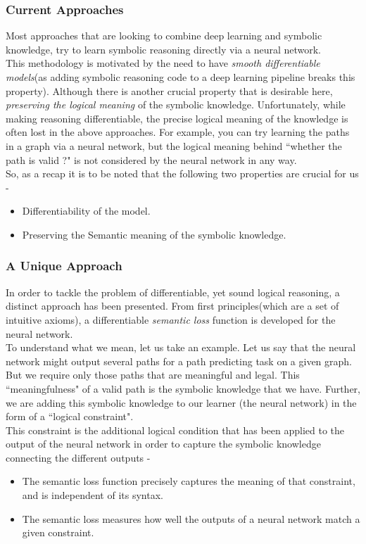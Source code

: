 \documentclass[12pt]{article}
\begin{document}
\subsubsection{Current Approaches}
Most approaches that are looking to combine deep learning and symbolic knowledge, try to learn symbolic reasoning directly via a neural network.\\
This methodology is motivated by the need to have \textit{smooth differentiable models}(as adding symbolic reasoning code to a deep learning pipeline breaks this property). Although there is another crucial property that is desirable here, \textit{preserving the logical meaning} of the symbolic knowledge. Unfortunately, while making reasoning differentiable, the precise logical meaning of the knowledge is often lost in the above approaches. For example, you can try learning the paths in a graph via a neural network, but the logical meaning behind ``whether the path is valid ?" is not considered by the neural network in any way.\\
So, as a recap it is to be noted that the following two properties are crucial for us - 
\begin{itemize}
    \item Differentiability of the model.
    \item Preserving the Semantic meaning of the symbolic knowledge.
\end{itemize}

\subsubsection{A Unique Approach}
In order to tackle the problem of differentiable, yet sound logical reasoning, a distinct approach has been presented. From first principles(which are a set of intuitive axioms), a differentiable \textit{semantic loss} function is developed for the neural network.\\
To understand what we mean, let us take an example. Let us say that the neural network might output several paths for a path predicting task on a given graph. But we require only those paths that are meaningful and legal. This ``meaningfulness" of a valid path is the symbolic knowledge that we have. Further, we are adding this symbolic knowledge to our learner (the neural network) in the form of a ``logical constraint".\\ 
This constraint is the additional logical condition that has been applied to the output of the neural network in order to capture the symbolic knowledge connecting the different outputs - \\ 
\begin{itemize}
    \item The semantic loss function precisely captures the meaning of that constraint, and is independent of its syntax.
    \item The semantic loss measures how well the outputs of a neural network match a given constraint.
\end{itemize}
\end{document}
